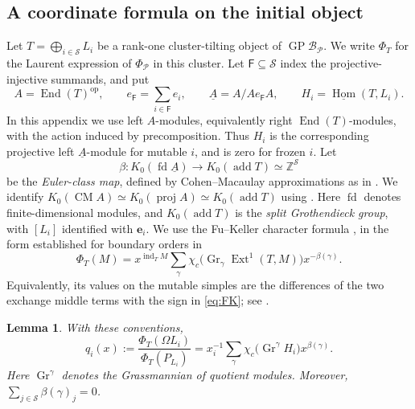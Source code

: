 \documentclass[11pt]{amsart}
\numberwithin{equation}{section}
\newtheorem{lemma}[theorem]{Lemma}
\theoremstyle{definition}
\theoremstyle{remark}
\newcommand{\op}[1]{\operatorname{#1}}
\newcommand{\Pcal}{\mathcal P}
\newcommand{\ZZ}{\mathbb Z}
\newcommand{\add}{\op{add}}
\newcommand{\Hom}{\op{Hom}}
\newcommand{\Ext}{\op{Ext}}
\newcommand{\End}{\op{End}}
\newcommand{\Gr}{\op{Gr}}
\newcommand{\CM}{\op{CM}}
\newcommand{\GP}{\op{GP}}
\newcommand{\ind}{\op{ind}}
\begin{document}
\subsection{A coordinate formula on the initial object}
Let $T=\bigoplus_{i\in\mathcal S}L_i$ be a rank-one cluster-tilting
object of $\GP\mathcal B_\Pcal$. We write $\Phi_T$ for the Laurent
expression of $\Phi_\Pcal$ in this cluster. Let $\mathsf F\subseteq\mathcal S$
index the projective-injective summands, and put
\[ A=\End(T)^{\mathrm{op}},\qquad e_{\mathsf F}=\sum_{i\in\mathsf F}e_i,\qquad \underline A=A/Ae_{\mathsf F}A,
\qquad H_i=\underline{\Hom}(T,L_i). \]
In this appendix we use left $A$-modules, equivalently right
$\End(T)$-modules, with the action induced by precomposition.
Thus $H_i$ is the corresponding projective left $\underline A$-module
for mutable $i$, and is zero for frozen $i$. Let
\[ \beta:K_0(\op{fd}\underline A)\longrightarrow K_0(\add T)\simeq\ZZ^{\mathcal S} \]
be the \emph{Euler-class map}, defined by Cohen--Macaulay approximations
as in \cite[Section~5.1]{JKS24}. We identify
$K_0(\CM A)\simeq K_0(\op{proj}A)\simeq K_0(\add T)$
using \cite[equation~(4.1)]{JRS26}. Here $\op{fd}$ denotes
finite-dimensional modules, and $K_0(\add T)$ is the \emph{split
Grothendieck group}, with $[L_i]$ identified with $\mathbf e_i$. We use the Fu--Keller character formula
\cite[Section~3]{FK10}, in the form
established for boundary orders in \cite[equation~(6.2)]{JKS24}
\begin{equation}\label{eq:FK} \Phi_T(M)=x^{\ind_T M} \sum_\gamma\chi_c\bigl(\Gr_\gamma\Ext^1(T,M)\bigr)x^{-\beta(\gamma)}.\end{equation}
Equivalently, its values on the mutable simples are the differences of
the two exchange middle terms with the sign in \eqref{eq:FK}; see
\cite[Proposition~5.9]{JKS24}.

\begin{lemma}\label{lem:projective-F}
With these conventions,
\begin{equation}\label{eq:projective-F} q_i(x):=\frac{\Phi_T(\Omega L_i)}{\Phi_T(P_{L_i})} =x_i^{-1}\sum_\gamma\chi_c\bigl(\Gr^\gamma H_i\bigr)x^{\beta(\gamma)}.\end{equation}
Here $\Gr^\gamma$ denotes the Grassmannian of quotient modules. Moreover,
$\sum_{j\in\mathcal S}\beta(\gamma)_j=0$.
\end{lemma}
\end{document}
